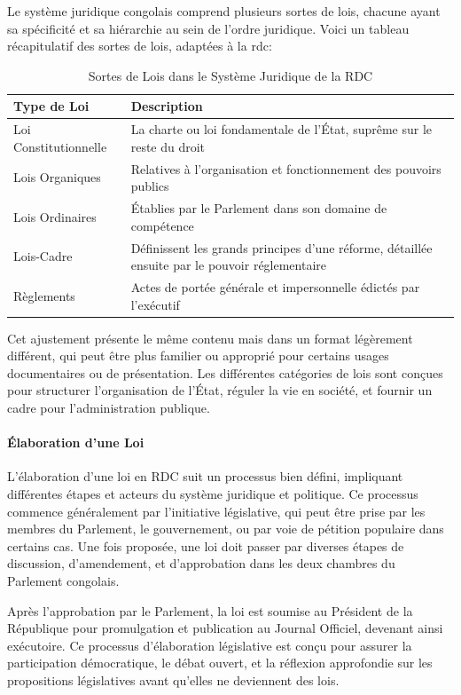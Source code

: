 Le système juridique congolais comprend plusieurs sortes de lois, chacune ayant sa spécificité et sa hiérarchie au sein de l'ordre juridique. Voici un tableau récapitulatif des sortes de lois, adaptées à la \ac{rdc}:

\begin{table}[h]
\centering
\begin{tabular}{|l|p{10.5cm}|}
\hline
\textbf{Type de Loi} & \textbf{Description} \\ \hline
Loi Constitutionnelle & La charte ou loi fondamentale de l'État, suprême sur le reste du droit \\ \hline
Lois Organiques & Relatives à l'organisation et fonctionnement des pouvoirs publics \\ \hline
Lois Ordinaires & Établies par le Parlement dans son domaine de compétence \\ \hline
Lois-Cadre & Définissent les grands principes d'une réforme, détaillée ensuite par le pouvoir réglementaire \\ \hline
Règlements & Actes de portée générale et impersonnelle édictés par l'exécutif \\ \hline
\end{tabular}
\caption{Sortes de Lois dans le Système Juridique de la RDC}
\end{table}

Cet ajustement présente le même contenu mais dans un format légèrement différent, qui peut être plus familier ou approprié pour certains usages documentaires ou de présentation. Les différentes catégories de lois sont conçues pour structurer l'organisation de l'État, réguler la vie en société, et fournir un cadre pour l'administration publique.


\paragraph{Élaboration d'une Loi} \hspace{0pt}

L'élaboration d'une loi en RDC suit un processus bien défini, impliquant différentes étapes et acteurs du système juridique et politique. Ce processus commence généralement par l'initiative législative, qui peut être prise par les membres du Parlement, le gouvernement, ou par voie de pétition populaire dans certains cas. Une fois proposée, une loi doit passer par diverses étapes de discussion, d'amendement, et d'approbation dans les deux chambres du Parlement congolais.

Après l'approbation par le Parlement, la loi est soumise au Président de la République pour promulgation et publication au Journal Officiel, devenant ainsi exécutoire. Ce processus d'élaboration législative est conçu pour assurer la participation démocratique, le débat ouvert, et la réflexion approfondie sur les propositions législatives avant qu'elles ne deviennent des lois.

